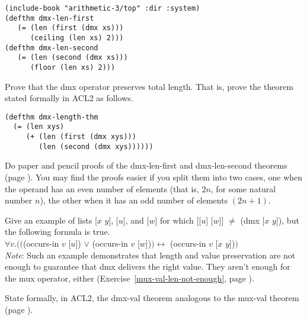 \label{thm:dmx-length-first-second}
\begin{Verbatim}
(include-book "arithmetic-3/top" :dir :system)
(defthm dmx-len-first
   (= (len (first (dmx xs)))
      (ceiling (len xs) 2)))
(defthm dmx-len-second
   (= (len (second (dmx xs)))
      (floor (len xs) 2)))
\end{Verbatim}

\begin{ExerciseList}
\Exercise
Prove that the \textsf{dmx} operator preserves total length.
That is, prove the theorem
stated formally in ACL2 as follows.

\label{thm:dmx-length}
\begin{Verbatim}
(defthm dmx-length-thm
  (= (len xys)
     (+ (len (first (dmx xys)))
        (len (second (dmx xys))))))
\end{Verbatim}

\Exercise
Do paper and pencil proofs of the dmx-len-first and dmx-len-second
theorems (page \pageref{thm:dmx-length-first-second}).
You may find the proofs easier if you split them into
two cases, one when the operand has an even number of elements
(that is, $2n$, for some natural number $n$),
the other when it has an odd number of elements $(2n+1)$.

\Exercise\label{dmx-val-len-not-enough}
Give an example of lists
\textsf{[$x$ $y$]}, \textsf{[$u$]}, and \textsf{[$w$]} for which
\textsf{[[$u$] [$w$]]} $\neq$ \textsf{(dmx [$x$ $y$])}, but the following formula is true.\\
\hspace*{1cm}$\forall v.(($\textsf{(occurs-in $v$ [$u$])} $\vee$ \textsf{(occurs-in $v$ [$w$])}$)
\leftrightarrow$ \textsf{(occurs-in $v$ [$x$ $y$])}$)$\\
\emph{Note}: Such an example demonstrates that length and value
preservation are not enough to guarantee that \textsf{dmx} delivers the right value.
They aren't enough for the \textsf{mux} operator, either
(Exercise~\ref{mux-val-len-not-enough}, page \pageref{mux-val-len-not-enough}).

\Exercise [label={ex:dmx-val-thm}]
State formally, in ACL2, the dmx-val theorem
analogous to the mux-val theorem (page \pageref{defthm:mux-val}).


\end{ExerciseList}
